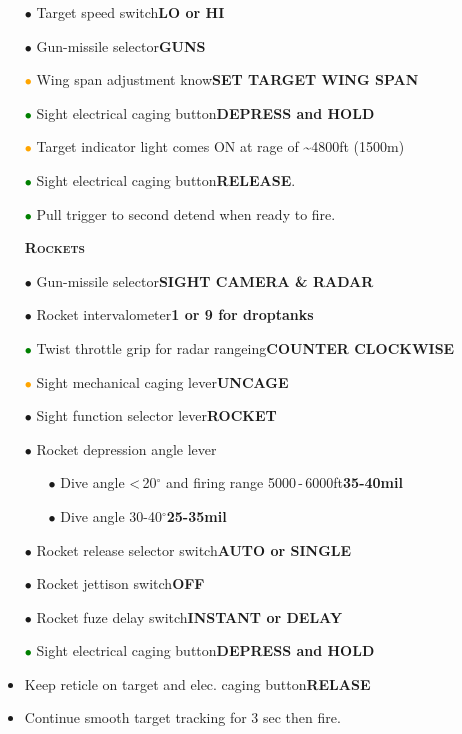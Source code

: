 \documentclass[a4paper,12pt,dvipsnames]{letter}
\newcommand{\button}[1]{\textbf{#1}}
\newcommand{\myHead}[1]{{\LARGE\textsc{\textbf{#1}}}}
\newcommand{\bi}{\textcolor{ProcessBlue}{$\bullet$\;}}
\newcommand{\gi}{\textcolor{Green}{$\bullet$\;}}
\newcommand{\oi}{\textcolor{Orange}{$\bullet$\;}}
\newcommand{\ai}{\textcolor{Apricot}{$\bullet$\;}}
\begin{document}
{\begin{itemize}
 \item[\bi] Target speed switch\dotfill\button{LO or HI}
 \item[\bi] Gun-missile selector\dotfill\button{GUNS}
 \item[\oi] Wing span adjustment know\dotfill\button{SET TARGET WING SPAN}
 \item[\gi] Sight electrical caging button\dotfill\button{DEPRESS and HOLD}
 \item[\oi] Target indicator light comes ON at rage of \textasciitilde4800\;ft (1500\;m)
 \item[\gi] Sight electrical caging button\dotfill\button{RELEASE}.
 \item[\gi] Pull trigger to second detend when ready to fire.
\end{itemize}
\begin{itemize}
 \item[] \myHead{Rockets}
 \item[\bi] Gun-missile selector\dotfill\button{SIGHT CAMERA \& RADAR}
 \item[\ai] Rocket intervalometer\dotfill\button{1 or 9 for droptanks}
 \item[\gi] Twist throttle grip for radar rangeing\dotfill\button{COUNTER CLOCKWISE}
 \item[\oi] Sight mechanical caging lever\dotfill\button{UNCAGE}
 \item[\bi] Sight function selector lever\dotfill\button{ROCKET}
 \item[\bi] Rocket depression angle lever
 \begin{itemize}
 \item[\bi] Dive angle <\,20$^\circ$ and firing range 5000\,-\,6000\;ft\dotfill\button{35-40\;mil}
 \item[\bi] Dive angle 30-40$^\circ$\dotfill\button{25-35\;mil}
 \end{itemize}
 \item[\bi] Rocket release selector switch\dotfill\button{AUTO or SINGLE}
 \item[\bi] Rocket jettison switch\dotfill\button{OFF}
 \item[\bi] Rocket fuze delay switch\dotfill\button{INSTANT or DELAY}
 \item[\gi] Sight electrical caging button\dotfill\button{DEPRESS and HOLD}
 \item Keep reticle on target and elec. caging button\dotfill\button{RELASE}
 \item Continue smooth target tracking for 3 sec then fire.
\end{itemize}
}
\end{document}
